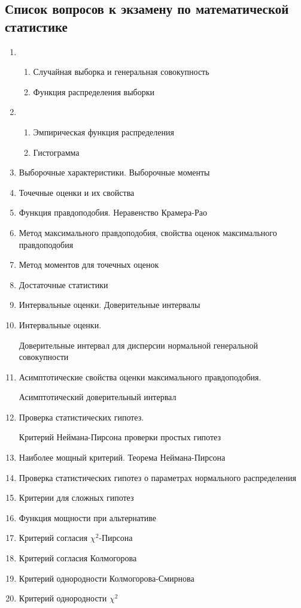 \subsection{Список вопросов к экзамену по математической
статистике}\label{ux441ux43fux438ux441ux43eux43a-ux432ux43eux43fux440ux43eux441ux43eux432-ux43a-ux44dux43aux437ux430ux43cux435ux43dux443-ux43fux43e-ux43cux430ux442ux435ux43cux430ux442ux438ux447ux435ux441ux43aux43eux439-ux441ux442ux430ux442ux438ux441ux442ux438ux43aux435}

\begin{enumerate}
\def\labelenumi{\arabic{enumi}.}
\item
  \begin{enumerate}
  \def\labelenumii{\arabic{enumii}.}
  \item
    Случайная выборка и генеральная совокупность
  \item
    Функция распределения выборки
  \end{enumerate}
\item
  \begin{enumerate}
  \def\labelenumii{\arabic{enumii}.}
  \item
    Эмпирическая функция распределения
  \item
    Гистограмма
  \end{enumerate}
\item
  Выборочные характеристики. Выборочные моменты
\item
  Точечные оценки и их свойства
\item
  Функция правдоподобия. Неравенство Крамера-Рао
\item
  Метод максимального правдоподобия, свойства оценок максимального
  правдоподобия
\item
  Метод моментов для точечных оценок
\item
  Достаточные статистики
\item
  Интервальные оценки. Доверительные интервалы
\item
  Интервальные оценки.

  Доверительные интервал для дисперсии нормальной генеральной
  совокупности
\item
  Асимптотические свойства оценки максимального правдоподобия.

  Асимптотический доверительный интервал
\item
  Проверка статистических гипотез.

  Критерий Неймана-Пирсона проверки простых гипотез
\item
  Наиболее мощный критерий. Теорема Неймана-Пирсона
\item
  Проверка статистических гипотез о параметрах нормального распределения
\item
  Критерии для сложных гипотез
\item
  Функция мощности при альтернативе
\item
  Критерий согласия \(\chi^2\)-Пирсона
\item
  Критерий согласия Колмогорова
\item
  Критерий однородности Колмогорова-Смирнова
\item
  Критерий однородности \(\chi^2\)
\end{enumerate}
